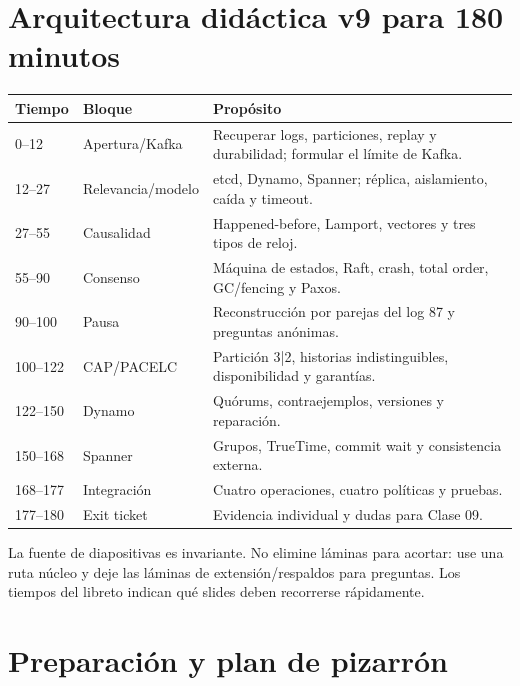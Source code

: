 \documentclass[variant=docente,cover=institutional,mode=screen]{ua-engineering-v6-article}
\begin{document}
\section{Arquitectura didáctica v9 para 180 minutos}
\begin{longtable}{p{}p{}p{}}
\toprule
Tiempo & Bloque & Propósito\\
\midrule
0--12 & Apertura/Kafka & Recuperar logs, particiones, replay y durabilidad; formular el límite de Kafka.\\
12--27 & Relevancia/modelo & etcd, Dynamo, Spanner; réplica, aislamiento, caída y timeout.\\
27--55 & Causalidad & Happened-before, Lamport, vectores y tres tipos de reloj.\\
55--90 & Consenso & Máquina de estados, Raft, crash, total order, GC/fencing y Paxos.\\
90--100 & Pausa & Reconstrucción por parejas del log 87 y preguntas anónimas.\\
100--122 & CAP/PACELC & Partición 3|2, historias indistinguibles, disponibilidad y garantías.\\
122--150 & Dynamo & Quórums, contraejemplos, versiones y reparación.\\
150--168 & Spanner & Grupos, TrueTime, commit wait y consistencia externa.\\
168--177 & Integración & Cuatro operaciones, cuatro políticas y pruebas.\\
177--180 & Exit ticket & Evidencia individual y dudas para Clase 09.\\
\bottomrule
\end{longtable}

\begin{uawarn}
La fuente de diapositivas es invariante. No elimine láminas para acortar: use una ruta núcleo y deje las láminas de extensión/respaldos para preguntas. Los tiempos del libreto indican qué slides deben recorrerse rápidamente.
\end{uawarn}

\section{Preparación y plan de pizarrón}
\end{document}
